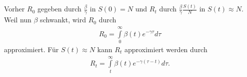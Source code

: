 \documentclass{scrartcl}
\begin{document}
\newpage
\noindent Vorher $R_0$ gegeben durch $\frac{\beta}{\gamma}$ in $S(0) = N$ und $R_t$ durch $\frac{\beta}{\gamma} \frac{S(t)}{N}$ in $S(t) \approx N$.\\
Weil nun $\beta$ schwankt, wird $R_0$ durch \begin{align*}
R_0 = \int\limits_0^\infty \beta(t) e^{-\gamma \tau} d\tau
\end{align*}
approximiert. Für $S(t) \approx N$ kann $R_t$ approximiert werden durch
\begin{align*}
R_t = \int\limits_t^\infty \beta(t) e^{-\gamma (\tau-t)} d\tau.
\end{align*}


%
%
\end{document}
